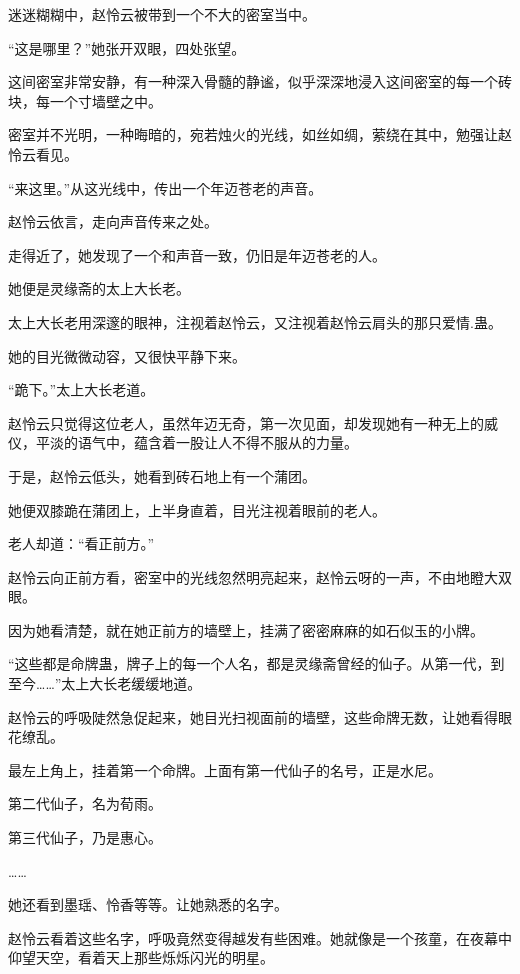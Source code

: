 
\begin{this_body}

迷迷糊糊中，赵怜云被带到一个不大的密室当中。

“这是哪里？”她张开双眼，四处张望。

这间密室非常安静，有一种深入骨髓的静谧，似乎深深地浸入这间密室的每一个砖块，每一个寸墙壁之中。

密室并不光明，一种晦暗的，宛若烛火的光线，如丝如绸，萦绕在其中，勉强让赵怜云看见。

“来这里。”从这光线中，传出一个年迈苍老的声音。

赵怜云依言，走向声音传来之处。

走得近了，她发现了一个和声音一致，仍旧是年迈苍老的人。

她便是灵缘斋的太上大长老。

太上大长老用深邃的眼神，注视着赵怜云，又注视着赵怜云肩头的那只爱情.蛊。

她的目光微微动容，又很快平静下来。

“跪下。”太上大长老道。

赵怜云只觉得这位老人，虽然年迈无奇，第一次见面，却发现她有一种无上的威仪，平淡的语气中，蕴含着一股让人不得不服从的力量。

于是，赵怜云低头，她看到砖石地上有一个蒲团。

她便双膝跪在蒲团上，上半身直着，目光注视着眼前的老人。

老人却道：“看正前方。”

赵怜云向正前方看，密室中的光线忽然明亮起来，赵怜云呀的一声，不由地瞪大双眼。

因为她看清楚，就在她正前方的墙壁上，挂满了密密麻麻的如石似玉的小牌。

“这些都是命牌蛊，牌子上的每一个人名，都是灵缘斋曾经的仙子。从第一代，到至今……”太上大长老缓缓地道。

赵怜云的呼吸陡然急促起来，她目光扫视面前的墙壁，这些命牌无数，让她看得眼花缭乱。

最左上角上，挂着第一个命牌。上面有第一代仙子的名号，正是水尼。

第二代仙子，名为荀雨。

第三代仙子，乃是惠心。

……

她还看到墨瑶、怜香等等。让她熟悉的名字。

赵怜云看着这些名字，呼吸竟然变得越发有些困难。她就像是一个孩童，在夜幕中仰望天空，看着天上那些烁烁闪光的明星。


\end{this_body}
